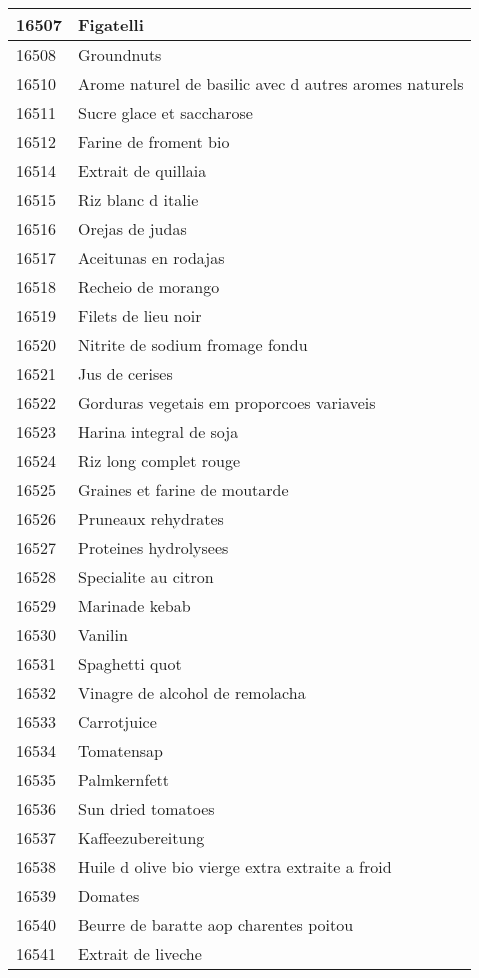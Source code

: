 \begin{longtable}{|l|l|}
16507 & Figatelli \\ \hline 
16508 & Groundnuts \\ \hline 
16510 & Arome naturel de basilic avec d autres aromes naturels \\ \hline 
16511 & Sucre glace et saccharose \\ \hline 
16512 & Farine de froment bio \\ \hline 
16514 & Extrait de quillaia \\ \hline 
16515 & Riz blanc d italie \\ \hline 
16516 & Orejas de judas \\ \hline 
16517 & Aceitunas en rodajas \\ \hline 
16518 & Recheio de morango \\ \hline 
16519 & Filets de lieu noir \\ \hline 
16520 & Nitrite de sodium fromage fondu \\ \hline 
16521 & Jus de cerises \\ \hline 
16522 & Gorduras vegetais em proporcoes variaveis \\ \hline 
16523 & Harina integral de soja \\ \hline 
16524 & Riz long complet rouge \\ \hline 
16525 & Graines et farine de moutarde \\ \hline 
16526 & Pruneaux rehydrates \\ \hline 
16527 & Proteines hydrolysees \\ \hline 
16528 & Specialite au citron \\ \hline 
16529 & Marinade kebab \\ \hline 
16530 & Vanilin \\ \hline 
16531 & Spaghetti quot \\ \hline 
16532 & Vinagre de alcohol de remolacha \\ \hline 
16533 & Carrotjuice \\ \hline 
16534 & Tomatensap \\ \hline 
16535 & Palmkernfett \\ \hline 
16536 & Sun dried tomatoes \\ \hline 
16537 & Kaffeezubereitung \\ \hline 
16538 & Huile d olive bio vierge extra extraite a froid \\ \hline 
16539 & Domates \\ \hline 
16540 & Beurre de baratte aop charentes poitou \\ \hline 
16541 & Extrait de liveche \\ \hline 

\end{longtable}
